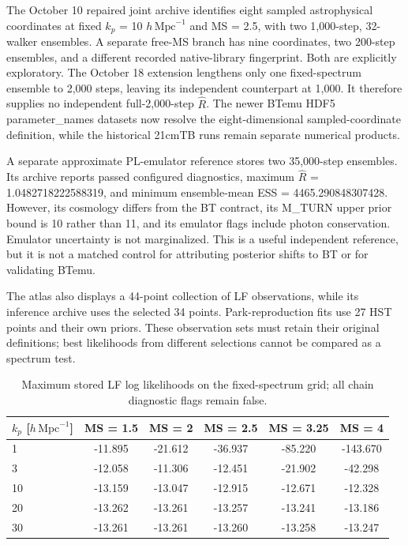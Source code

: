 The October 10 repaired joint archive identifies eight sampled astrophysical coordinates at fixed \ensuremath{k_p} = 10 $h\,\mathrm{Mpc}^{-1}$ and MS = 2.5, with two 1,000-step, 32-walker ensembles. A separate free-MS branch has nine coordinates, two 200-step ensembles, and a different recorded native-library fingerprint. Both are explicitly exploratory. The October 18 extension lengthens only one fixed-spectrum ensemble to 2,000 steps, leaving its independent counterpart at 1,000. It therefore supplies no independent full-2,000-step \(\widehat R\). The newer BTemu HDF5 parameter\_names datasets now resolve the eight-dimensional sampled-coordinate definition, while the historical 21cmTB runs remain separate numerical products.

A separate approximate PL-emulator reference stores two 35,000-step ensembles. Its archive reports passed configured diagnostics, maximum \(\widehat R\) = 1.0482718222588319, and minimum ensemble-mean ESS = 4465.290848307428. However, its cosmology differs from the BT contract, its M\_TURN upper prior bound is 10 rather than 11, and its emulator flags include photon conservation. Emulator uncertainty is not marginalized. This is a useful independent reference, but it is not a matched control for attributing posterior shifts to BT or for validating BTemu.

The atlas also displays a 44-point collection of LF observations, while its inference archive uses the selected 34 points. Park-reproduction fits use 27 HST points and their own priors. These observation sets must retain their original definitions; best likelihoods from different selections cannot be compared as a spectrum test.

\begin{table}[t]
\caption{Maximum stored LF log likelihoods on the fixed-spectrum grid; all chain diagnostic flags remain false.}
\label{tab:lf-values}
\centering\small
\begin{tabular}{lccccc}
\toprule
\ensuremath{k_p} {[}$h\,\mathrm{Mpc}^{-1}${]} & MS = 1.5 & MS = 2 & MS = 2.5 & MS = 3.25 & MS = 4 \\
\midrule
1 & -11.895 & -21.612 & -36.937 & -85.220 & -143.670 \\
3 & -12.058 & -11.306 & -12.451 & -21.902 & -42.298 \\
10 & -13.159 & -13.047 & -12.915 & -12.671 & -12.328 \\
20 & -13.262 & -13.261 & -13.257 & -13.241 & -13.186 \\
30 & -13.261 & -13.261 & -13.260 & -13.258 & -13.247 \\
\bottomrule
\end{tabular}
\end{table}

